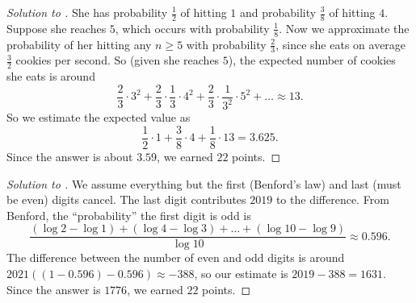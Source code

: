 \documentclass[11pt]{scrartcl}
\begin{document}
\begin{proof}[Solution to ]
	She has probability $\frac12$ of hitting $1$ and probability $\frac38$ of hitting $4$. Suppose she reaches $5$, which occurs with probability $\frac18$. Now we approximate the probability of her hitting any $n \ge 5$ with probability $\frac23$, since she eats on average $\frac32$ cookies per second. So (given she reaches $5$), the expected number of cookies she eats is around
    \[\frac23 \cdot 3^2 + \frac23 \cdot \frac13 \cdot 4^2 + \frac23 \cdot \frac1{3^2} \cdot 5^2 + \dots \approx 13.\]
    So we estimate the expected value as
    \[\frac12 \cdot 1 + \frac38 \cdot 4 + \frac18 \cdot 13 = 3.625.\]
    Since the answer is about $3.59$, we earned $22$ points.
\end{proof}

\begin{proof}[Solution to ]
	We assume everything but the first (Benford's law) and last (must be even) digits cancel. The last digit contributes $2019$ to the difference. From Benford, the ``probability'' the first digit is odd is
    \[\frac{(\log 2 - \log 1) + (\log 4 - \log 3) + \dots + (\log 10 - \log 9)}{\log 10} \approx 0.596.\]
    The difference between the number of even and odd digits is around $2021((1 - 0.596) - 0.596) \approx -388$, so our estimate is $2019 - 388 = 1631$. Since the answer is $1776$, we earned $22$ points.
\end{proof}
\end{document}
